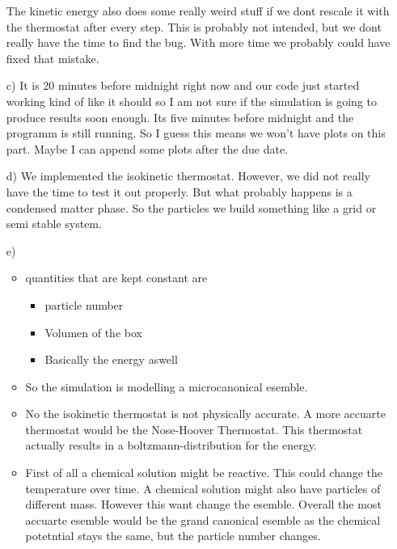 \begin{itemize}
        The kinetic energy also does some really weird stuff if we dont rescale it with the thermostat after every step.
        This is probably not intended, but we dont really have the time to find the bug.
        With more time we probably could have fixed that mistake.
    \item[c)] It is 20 minutes before midnight right now and our code just started working kind of like it should so I am not sure if the simulation is going to produce results soon enough.
            Its five minutes before midnight and the programm is still running.
            So I guess this means we won't have plots on this part.
            Maybe I can append some plots after the due date.
    \item[d)]
        We implemented the isokinetic thermostat. 
        However, we did not really have the time to test it out properly.
        But what probably happens is a condensed matter phase.
        So the particles we build something like a grid or semi stable system.
    \item[e)]
    \begin{itemize}
        \item quantities that are kept constant are 
        \begin{itemize}
            \item particle number
            \item Volumen of the box 
            \item Basically the energy aswell
        \end{itemize}
        \item So the simulation is modelling a microcanonical esemble.
        \item No the isokinetic thermostat is not physically accurate. A more accuarte thermostat would be the Nose-Hoover Thermostat.
        This thermostat actually results in a boltzmann-distribution for the energy.
        \item First of all a chemical solution might be reactive. This could change the temperature over time.
        A chemical solution might also have particles of different mass. However this want change the esemble.
        Overall the most accuarte esemble would be the grand canonical esemble as the chemical potetntial stays the same, but the particle number changes.

    \end{itemize}
\end{itemize}
